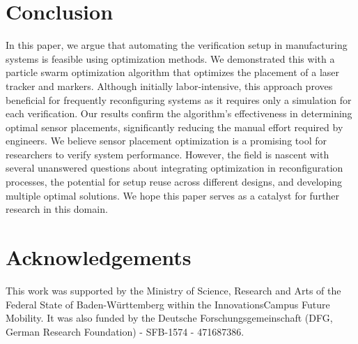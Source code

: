 \documentclass{svproc}
\begin{document}
\section{Conclusion}

In this paper, we argue that automating the verification setup in manufacturing systems is feasible using optimization methods.
We demonstrated this with a particle swarm optimization algorithm that optimizes the placement of a laser tracker and markers.
Although initially labor-intensive, this approach proves beneficial for frequently reconfiguring systems as it requires only a simulation for each verification.
Our results confirm the algorithm's effectiveness in determining optimal sensor placements, significantly reducing the manual effort required by engineers.
We believe sensor placement optimization is a promising tool for researchers to verify system performance.
However, the field is nascent with several unanswered questions about integrating optimization in reconfiguration processes,
the potential for setup reuse across different designs, and developing multiple optimal solutions.
We hope this paper serves as a catalyst for further research in this domain.


\section{Acknowledgements}
This work was supported by the Ministry of Science, Research and Arts of the Federal State of Baden-Württemberg within the InnovationsCampus Future Mobility.
It was also funded by the Deutsche Forschungsgemeinschaft (DFG, German Research Foundation) - SFB-1574 - 471687386.
\printbibliography
\end{document}
